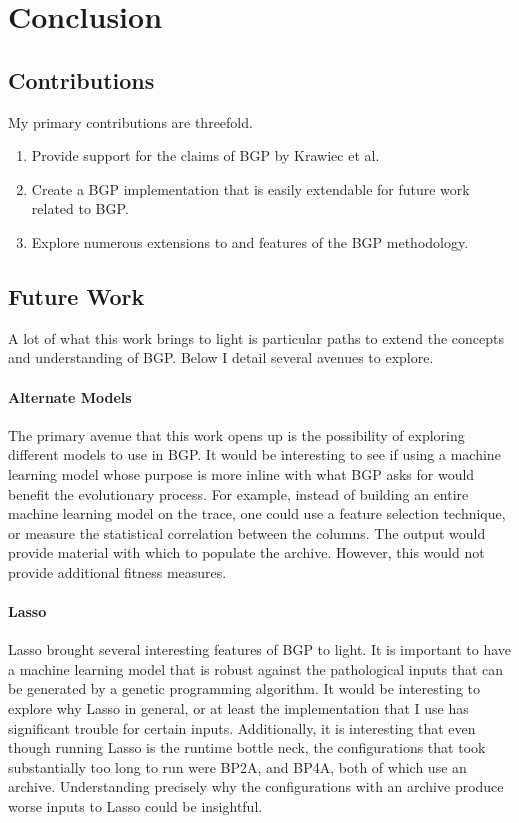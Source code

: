 \chapter{Conclusion}
\label{chap:conclusion}

\section{Contributions} 
\label{section:contributions}
My primary contributions are threefold.

\begin{enumerate}[noitemsep]
\item Provide support for the claims of BGP by Krawiec et al.
\item Create a BGP implementation that is easily extendable for future work related to BGP.
\item Explore numerous extensions to and features of the BGP methodology.
\end{enumerate}

\section{Future Work}
\label{section:future_work}
A lot of what this work brings to light is particular paths to extend the concepts and understanding of BGP.  Below I detail several avenues to explore.

\subsubsection{Alternate Models}
The primary avenue that this work opens up is the possibility of exploring different models to use in BGP.  It would be interesting to see if using a machine learning model whose purpose is more inline with what BGP asks for would benefit the evolutionary process.  For example, instead of building an entire machine learning model on the trace, one could use a feature selection technique, or measure the statistical correlation between the columns.  The output would provide material with which to populate the archive.  However, this would not provide additional fitness measures.

\subsubsection{Lasso}
Lasso brought several interesting features of BGP to light.  It is important to have a machine learning model that is robust against the pathological inputs that can be generated by a genetic programming algorithm.  It would be interesting to explore why Lasso in general, or at least the implementation that I use has significant trouble for certain inputs.  Additionally, it is interesting that even though running Lasso is the runtime bottle neck, the configurations that took substantially too long to run were BP2A, and BP4A, both of which use an archive.  Understanding precisely why the configurations with an archive produce worse inputs to Lasso could be insightful.

